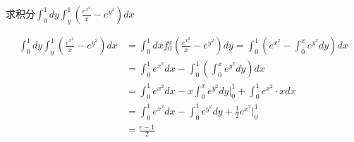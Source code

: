 \documentclass{article}
\begin{document}
\begin{examplle}[]
求积分\(\int_0^1dy\int_y^1\left(\frac{e^{x^2}}{x}-e^{y^2}\right)dx\)

\begin{align*}
\int_0^1dy\int_y^1\left(\frac{e^{x^2}}{x}-e^{y^2}\right)dx&=
\int_0^1dxf_0^x\left(\frac{e^{x^2}}{x}-e^{y^2}\right)dy=
\int_0^1(e^{x^2}-\int_0^xe^{y^2}dy)dx\\
&=\int_0^1e^{x^2}dx-\int_0^1(\int_0^xe^{y^2}dy)dx\\&=
\int_0^1e^{x^2}dx-x\int_0^xe^{y^2}dy\Big\rvert_0^1+
\int_0^1e^{x^2}\cdot xdx\\
&=\int_0^1e^{x^2}dx-\int_0^1e^{y^2}dy+\frac{1}{2}e^{x^2}\Big\rvert_0^1\\
&=\frac{e-1}{2}
\end{align*}
\end{examplle}
\end{document}
